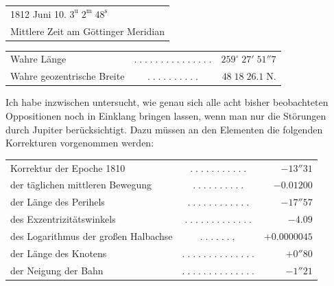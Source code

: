 \begin{center}\fontsize{10}{12}\selectfont\setlength{\tabcolsep}{0pt}\renewcommand{\arraystretch}{1.15}\begin{tabular}{l}
1812 Juni 10. $3^{\mathrm u}\;2^{\mathrm m}\;48^{\mathrm s}$\\Mittlere Zeit am Göttinger Meridian
\end{tabular}\end{center}
\begin{center}\fontsize{10}{12}\selectfont\setlength{\tabcolsep}{2pt}\renewcommand{\arraystretch}{1.15}\begin{tabular}{lcr}
Wahre Länge & $.\;.\;.\;.\;.\;.\;.\;.\;.\;.\;.\;.\;.\;.\;.$ & $259^\circ\;27'\;51''7$\\
Wahre geozentrische Breite & $.\;.\;.\;.\;.\;.\;.\;.\;.\;.$ & $48\;18\;26.1\;\mathrm{N}.$\\
\end{tabular}\end{center}

\par\indent Ich habe inzwischen untersucht, wie genau sich alle acht bisher beobachteten Oppositionen noch in Einklang bringen lassen, wenn man nur die Störungen durch Jupiter berücksichtigt. Dazu müssen an den Elementen die folgenden Korrekturen vorgenommen werden:

\begin{center}\fontsize{9}{11}\selectfont\setlength{\tabcolsep}{2pt}\renewcommand{\arraystretch}{1.15}\begin{tabular}{lcr}
Korrektur der Epoche 1810 & $.\;.\;.\;.\;.\;.\;.\;.\;.\;.\;.$ & $-13''31$\\
der täglichen mittleren Bewegung & $.\;.\;.\;.\;.\;.\;.\;.\;.\;.$ & $-0.01200$\\
der Länge des Perihels & $.\;.\;.\;.\;.\;.\;.\;.\;.\;.\;.\;.$ & $-17''57$\\
des Exzentrizitätswinkels & $.\;.\;.\;.\;.\;.\;.\;.\;.\;.\;.\;.\;.$ & $-4.09$\\
des Logarithmus der großen Halbachse & $.\;.\;.\;.\;.\;.\;,$ & $+0.0000045$\\
der Länge des Knotens & $.\;.\;.\;.\;.\;.\;.\;.\;.\;.\;.\;.\;.\;.$ & $+0''80$\\
der Neigung der Bahn & $.\;.\;.\;.\;.\;.\;.\;.\;.\;.\;.\;.\;.\;.$ & $-1''21$\\
\end{tabular}\end{center}

